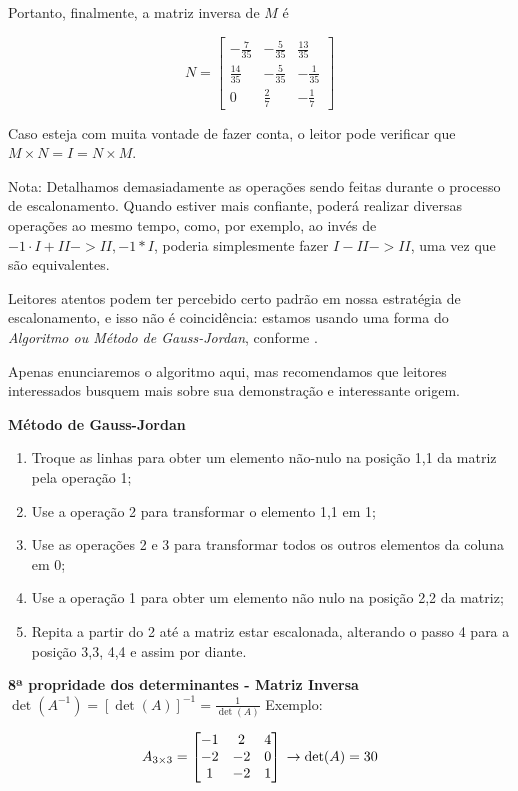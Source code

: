 \documentclass[
  portuguese,
  letterpaper,
  DIV=11,
  numbers=noendperiod]{scrreport}
\begin{document}
Portanto, finalmente, a matriz inversa de \(M\) é

\[
N = 
\begin{bmatrix}
    -\frac{7}{35} & -\frac{5}{35} & \frac{13}{35} \\
    \frac{14}{35} & -\frac{5}{35} & -\frac{1}{35} \\
    0 &\frac{2}{7} & -\frac{1}{7}
\end{bmatrix}
\]

Caso esteja com muita vontade de fazer conta, o leitor pode verificar
que \(M\times N = I = N \times M\).

Nota: Detalhamos demasiadamente as operações sendo feitas durante o
processo de escalonamento. Quando estiver mais confiante, poderá
realizar diversas operações ao mesmo tempo, como, por exemplo, ao invés
de \(-1\cdot I + II -> II, -1*I\), poderia simplesmente fazer
\(I-II->II\), uma vez que são equivalentes.

Leitores atentos podem ter percebido certo padrão em nossa estratégia de
escalonamento, e isso não é coincidência: estamos usando uma forma do
\emph{Algoritmo ou Método de Gauss-Jordan}, conforme
\textcite{sekhon_systems_2020}.

Apenas enunciaremos o algoritmo aqui, mas recomendamos que leitores
interessados busquem mais sobre sua demonstração e interessante origem.

\textbf{Método de Gauss-Jordan}

\begin{enumerate}
\def\labelenumi{\arabic{enumi}.}
\item
  Troque as linhas para obter um elemento não-nulo na posição 1,1 da
  matriz pela operação 1;
\item
  Use a operação 2 para transformar o elemento 1,1 em 1;
\item
  Use as operações 2 e 3 para transformar todos os outros elementos da
  coluna em 0;
\item
  Use a operação 1 para obter um elemento não nulo na posição 2,2 da
  matriz;
\item
  Repita a partir do 2 até a matriz estar escalonada, alterando o passo
  4 para a posição 3,3, 4,4 e assim por diante.
\end{enumerate}

\textbf{8ª propridade dos determinantes - Matriz Inversa}
\(\det(A^{-1}) = [\det(A)]^{-1} = \frac{1}{\det(A)}\) Exemplo:

\[
A_{3\times3} =
\begin{bmatrix}
    -1 & 2 & 4  \\
    -2 & -2 & 0 \\
    1 & -2 & 1 \\
\end{bmatrix}  \\
\rightarrow \det(A) = 30
\]
\end{document}
